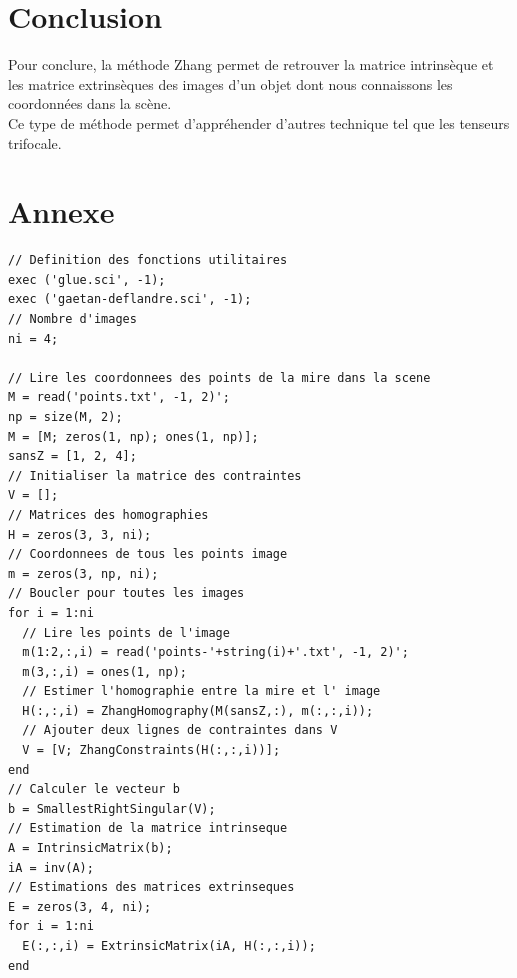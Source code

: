 \documentclass[a4paper,11pt]{article}
\begin{document}
\section{Conclusion}

Pour conclure, la méthode Zhang permet de retrouver la matrice intrinsèque et les 
matrice extrinsèques des images d'un objet dont nous connaissons les coordonnées dans 
la scène.\\

Ce type de méthode permet d'appréhender d'autres technique tel que les tenseurs trifocale.

\section{Annexe}

\begin{lstlisting}[caption=Macro générale qui va appeler les fonctions]
// Definition des fonctions utilitaires
exec ('glue.sci', -1);
exec ('gaetan-deflandre.sci', -1);
// Nombre d'images
ni = 4;

// Lire les coordonnees des points de la mire dans la scene
M = read('points.txt', -1, 2)';
np = size(M, 2);
M = [M; zeros(1, np); ones(1, np)];
sansZ = [1, 2, 4];
// Initialiser la matrice des contraintes
V = [];
// Matrices des homographies
H = zeros(3, 3, ni);
// Coordonnees de tous les points image
m = zeros(3, np, ni);
// Boucler pour toutes les images
for i = 1:ni
  // Lire les points de l'image
  m(1:2,:,i) = read('points-'+string(i)+'.txt', -1, 2)';
  m(3,:,i) = ones(1, np);
  // Estimer l'homographie entre la mire et l' image
  H(:,:,i) = ZhangHomography(M(sansZ,:), m(:,:,i));
  // Ajouter deux lignes de contraintes dans V
  V = [V; ZhangConstraints(H(:,:,i))];
end
// Calculer le vecteur b
b = SmallestRightSingular(V);
// Estimation de la matrice intrinseque
A = IntrinsicMatrix(b);
iA = inv(A);
// Estimations des matrices extrinseques
E = zeros(3, 4, ni);
for i = 1:ni
  E(:,:,i) = ExtrinsicMatrix(iA, H(:,:,i));
end
\end{lstlisting}
\end{document}
